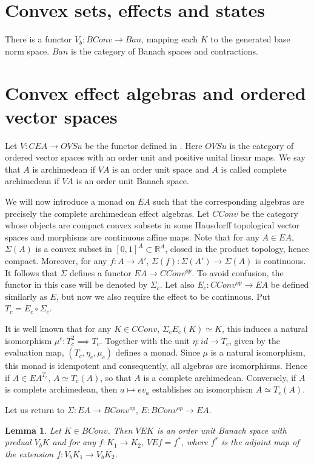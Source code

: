 \documentclass[12pt]{article}
\newtheorem{lemma}{Lemma}
\begin{document}
\section{Convex sets, effects and states}

There is a functor $V_b: BConv\to Ban$, mapping each $K$ to the generated base norm space.  $Ban$ is the category of Banach spaces and  contractions.


\section{Convex effect algebras and ordered vector spaces}

Let $V: CEA\to OVSu$ be the functor defined in \cite{sylviaetc}. Here $OVSu$ is the category of ordered vector spaces with an order unit and positive unital linear maps. We say that $A$ is archimedean if $VA$ is an order unit space and $A$ is called  complete archimedean  if $VA$ is an  order unit Banach space. 

We will now introduce a monad on $EA$ such that the corresponding algebras are precisely the complete archimedean effect algebras. Let $CConv$ be the category whose objects are compact convex subsets in some Hausdorff topological vector spaces
 and morphisms are continuous affine maps. Note that for any $A\in EA$, $\Sigma(A)$ is a convex subset in $[0,1]^A\subset \mathbb R^A$, closed in the product topology, hence compact. Moreover, for any $f:A\to A'$, $\Sigma(f):\Sigma(A')\to \Sigma(A)$ is continuous. It follows that $\Sigma$ defines a functor $EA\to  CConv^{op}$. To avoid confusion, the functor in this case will be denoted by $\Sigma_c$. Let also $E_c:CConv^{op}\to EA$ be defined similarly as $E$, but now we also require the effect to be continuous. Put $T_c=E_c\circ\Sigma_c$.


It is well known that for any $K\in CConv$, $\Sigma_cE_c(K)\simeq K$, this induces a natural isomorphism $\mu^c:T_c^2\implies T_c$. Together with the unit $\eta: id\to T_c$, given by the evaluation map, $(T_c,\eta_c,\mu_c)$ defines a monad. Since $\mu$ is a natural isomorphism, this monad is idempotent and consequently, all algebras are isomorphisms. Hence if
$A\in EA^{T_c}$, $A\simeq T_c(A)$, so that $A$ is a complete archimedean. Conversely, if $A$ is complete archimedean, 
 then $a\mapsto ev_a$ establishes an isomorphism $A\simeq T_c(A)$. 


Let us return to  $\Sigma: EA\to BConv^{op}$, $E:BConv^{op}\to EA$.

\begin{lemma}\label{lemma:bas} Let $K\in BConv$. Then $VEK$ is an order unit Banach space with predual $V_bK$ and for any $f: K_1\to K_2$,
 $VEf=f^*$, where $f^*$ is the adjoint map of the extension  $f: V_bK_1\to V_bK_2$.

\end{lemma}
\end{document}
